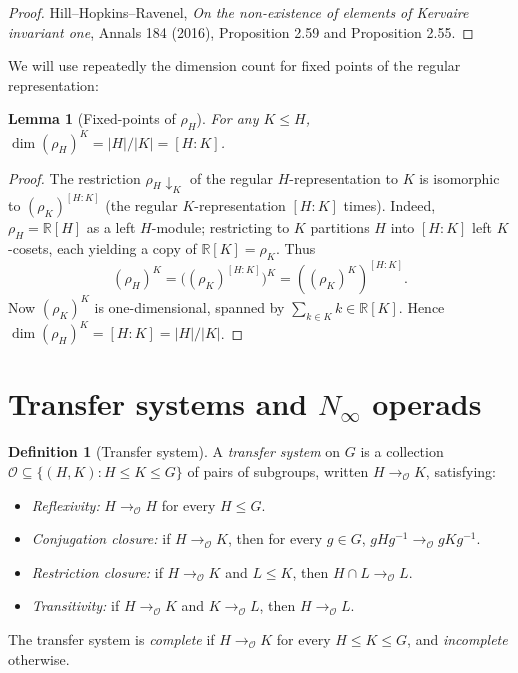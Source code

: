 \documentclass[12pt]{article}
\newtheorem{lemma}[theorem]{Lemma}
\theoremstyle{definition}
\newtheorem{definition}[theorem]{Definition}
\newcommand{\OO}{\mathcal{O}}
\begin{document}
\begin{proof}
Hill--Hopkins--Ravenel, \emph{On the non-existence of elements of Kervaire
invariant one}, Annals 184 (2016), Proposition 2.59 and Proposition 2.55.
\end{proof}

We will use repeatedly the dimension count for fixed points of the regular
representation:

\begin{lemma}[Fixed-points of $\rho_{H}$]\label{lem:rho-fix}
For any $K\leq H$, $\dim(\rho_{H})^{K}=|H|/|K|=[H:K]$.
\end{lemma}

\begin{proof}
The restriction $\rho_{H}\downarrow_{K}$ of the regular $H$-representation to
$K$ is isomorphic to $(\rho_{K})^{[H:K]}$ (the regular $K$-representation
$[H:K]$ times). Indeed, $\rho_{H}=\mathbb{R}[H]$ as a left $H$-module;
restricting to $K$ partitions $H$ into $[H:K]$ left $K$-cosets, each yielding a
copy of $\mathbb{R}[K]=\rho_{K}$. Thus
\[
(\rho_{H})^{K}=\bigl((\rho_{K})^{[H:K]}\bigr)^{K}=
((\rho_{K})^{K})^{[H:K]}.
\]
Now $(\rho_{K})^{K}$ is one-dimensional, spanned by $\sum_{k\in K}k\in
\mathbb{R}[K]$. Hence $\dim(\rho_{H})^{K}=[H:K]=|H|/|K|$.
\end{proof}

\section{Transfer systems and $N_\infty$ operads}\label{sec:trans}

\begin{definition}[Transfer system]\label{def:trans}
A \emph{transfer system} on $G$ is a collection
$\OO\subseteq\{(H,K):H\leq K\leq G\}$ of pairs of subgroups, written
$H\to_{\OO}K$, satisfying:
\begin{itemize}
\item[\textup{(T1)}] \emph{Reflexivity:} $H\to_{\OO}H$ for every $H\leq G$.
\item[\textup{(T2)}] \emph{Conjugation closure:} if $H\to_{\OO}K$, then for
every $g\in G$, $gHg^{-1}\to_{\OO}gKg^{-1}$.
\item[\textup{(T3)}] \emph{Restriction closure:} if $H\to_{\OO}K$ and
$L\leq K$, then $H\cap L\to_{\OO}L$.
\item[\textup{(T4)}] \emph{Transitivity:} if $H\to_{\OO}K$ and $K\to_{\OO}L$,
then $H\to_{\OO}L$.
\end{itemize}
The transfer system is \emph{complete} if $H\to_{\OO}K$ for every
$H\leq K\leq G$, and \emph{incomplete} otherwise.
\end{definition}
\end{document}
